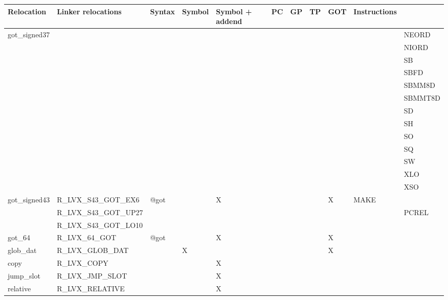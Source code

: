 {\tiny
\begin{tabular}{|l|l|l|l|l|l|l|l|l|l|l|} \hline
\textsf{Relocation} & \textsf{Linker relocations} & \textsf{Syntax} & \textsf{Symbol} & \textsf{Symbol + addend} & \textsf{PC} & \textsf{GP} & \textsf{TP} & \textsf{GOT} & \textsf{Instructions} \\
\hline
\textsf{got\_signed37} & & & & & & & & & & \textsf{NEORD} \\
 & & & & & & & & & & \textsf{NIORD} \\
 & & & & & & & & & & \textsf{SB} \\
 & & & & & & & & & & \textsf{SBFD} \\
 & & & & & & & & & & \textsf{SBMM8D} \\
 & & & & & & & & & & \textsf{SBMMT8D} \\
 & & & & & & & & & & \textsf{SD} \\
 & & & & & & & & & & \textsf{SH} \\
 & & & & & & & & & & \textsf{SO} \\
 & & & & & & & & & & \textsf{SQ} \\
 & & & & & & & & & & \textsf{SW} \\
 & & & & & & & & & & \textsf{XLO} \\
 & & & & & & & & & & \textsf{XSO} \\
\hline
\textsf{got\_signed43} & \textsf{R\_LVX\_S43\_GOT\_EX6} & \textsf{@got} & \textsf{} & \textsf{X} & \textsf{} & \textsf{} & \textsf{} & \textsf{X} & \textsf{MAKE} \\
 & \textsf{R\_LVX\_S43\_GOT\_UP27} & & & & & & & & & \textsf{PCREL} \\
 & \textsf{R\_LVX\_S43\_GOT\_LO10} & & & & & & & & & \\
\hline
\textsf{got\_64} & \textsf{R\_LVX\_64\_GOT} & \textsf{@got} & \textsf{} & \textsf{X} & \textsf{} & \textsf{} & \textsf{} & \textsf{X} & \textsf{} \\
\hline
\textsf{glob\_dat} & \textsf{R\_LVX\_GLOB\_DAT} & \textsf{} & \textsf{X} & \textsf{} & \textsf{} & \textsf{} & \textsf{} & \textsf{X} & \textsf{} \\
\hline
\textsf{copy} & \textsf{R\_LVX\_COPY} & \textsf{} & \textsf{} & \textsf{X} & \textsf{} & \textsf{} & \textsf{} & \textsf{} & \textsf{} \\
\hline
\textsf{jump\_slot} & \textsf{R\_LVX\_JMP\_SLOT} & \textsf{} & \textsf{} & \textsf{X} & \textsf{} & \textsf{} & \textsf{} & \textsf{} & \textsf{} \\
\hline
\textsf{relative} & \textsf{R\_LVX\_RELATIVE} & \textsf{} & \textsf{} & \textsf{X} & \textsf{} & \textsf{} & \textsf{} & \textsf{} & \textsf{} \\

\end{tabular}}
